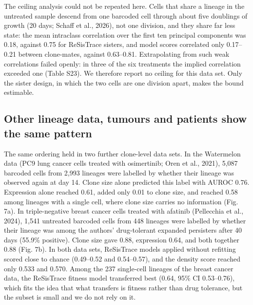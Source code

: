 \documentclass[11pt,a4paper]{article}
\begin{document}
The ceiling analysis could not be repeated here. Cells that share a lineage in the untreated sample descend from one barcoded cell through about five doublings of growth (20 days; Schaff et al., 2026), not one division, and they share far less state: the mean intraclass correlation over the first ten principal components was 0.18, against 0.75 for ReSisTrace sisters, and model scores correlated only 0.17--0.21 between clone-mates, against 0.63--0.81. Extrapolating from such weak correlations failed openly: in three of the six treatments the implied correlation exceeded one (Table S23). We therefore report no ceiling for this data set. Only the sister design, in which the two cells are one division apart, makes the bound estimable.

\subsection*{Other lineage data, tumours and patients show the same pattern}

The same ordering held in two further clone-level data sets. In the Watermelon data (PC9 lung cancer cells treated with osimertinib; Oren et al., 2021), 5,087 barcoded cells from 2,993 lineages were labelled by whether their lineage was observed again at day 14. Clone size alone predicted this label with AUROC 0.76. Expression alone reached 0.61, added only 0.01 to clone size, and reached 0.58 among lineages with a single cell, where clone size carries no information (Fig. 7a). In triple-negative breast cancer cells treated with afatinib (Pellecchia et al., 2024), 1,541 untreated barcoded cells from 448 lineages were labelled by whether their lineage was among the authors' drug-tolerant expanded persisters after 40 days (55.9\% positive). Clone size gave 0.88, expression 0.64, and both together 0.88 (Fig. 7b). In both data sets, ReSisTrace models applied without refitting scored close to chance (0.49--0.52 and 0.54--0.57), and the density score reached only 0.533 and 0.570. Among the 237 single-cell lineages of the breast cancer data, the ReSisTrace fitness model transferred best (0.64, 95\% CI 0.53--0.76), which fits the idea that what transfers is fitness rather than drug tolerance, but the subset is small and we do not rely on it.
\end{document}

